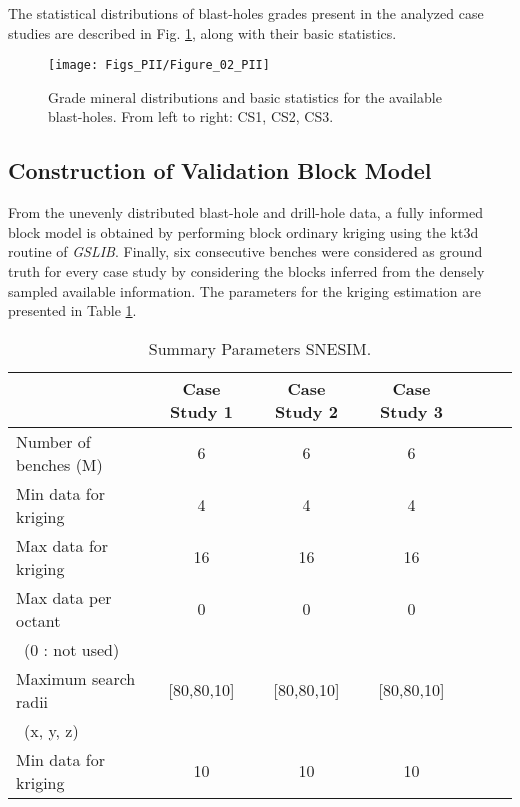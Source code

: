 \newpage
The statistical distributions of blast-holes grades present in the analyzed case studies are described in Fig. \ref{fig:db_hist_PII}, along with their basic statistics.
\begin{figure}
	\centering
	\texttt{[image: Figs\_PII/Figure\_02\_PII]}
	\caption[Grade distributions and statistics for the selected databases.]{\label{fig:db_hist_PII}Grade mineral distributions and basic statistics for the available blast-holes. From left to right: CS1, CS2, CS3. }
\end{figure}
\subsection{Construction of Validation Block Model}
From the unevenly distributed blast-hole and drill-hole data, a fully informed block model is obtained by performing block ordinary kriging using the kt3d routine of \emph{GSLIB}. Finally, six consecutive benches were considered as ground truth for every case study by considering the blocks inferred from the densely sampled available information. The parameters for the kriging estimation are presented in Table \ref{tab:paramsSGEMS_PII}.

\begin{table}
	\caption{Summary Parameters SNESIM.}
	\label{tab:paramsSGEMS_PII}
	\begin{center}
		\begin{tabular}{lcccccc}\toprule
			& {Case Study 1} & {Case Study 2}& {Case Study 3}\\\midrule
			Number of benches (M) & 6 		& 6 		& 6\\
			Min data for kriging  & 4   		& 4  		& 4\\
			Max data for kriging  & 16  		& 16  		& 16\\	             	   
			Max data per octant   & 0		& 0			& 0\\
			\ (0 : not used)   	 &   		&   		& \\       
			Maximum search radii  &[80,80,10]&[80,80,10]&[80,80,10]\\
			\ (x, y, z)   			 &   		&   	& \\ 
			Min data for kriging  & 10   		& 10  		& 10\\
			
			\bottomrule
		\end{tabular}
	\end{center}
\end{table}



